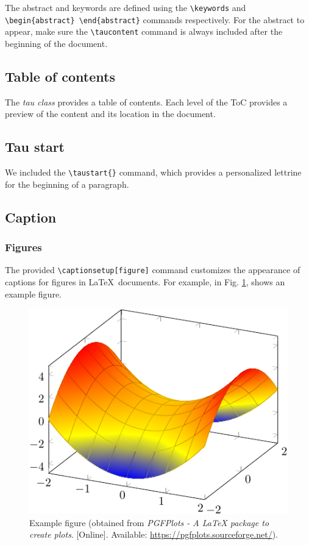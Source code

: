 \documentclass[9pt,a4paper,twoside]{tau}
\begin{document}
        The abstract and keywords are defined using the \verb*|\keywords| and \verb*|\begin{abstract} \end{abstract}| commands respectively. For the abstract to appear, make sure the \verb|\taucontent| command is always included after the beginning of the document.

    \subsection{Table of contents}

        The \textit{tau class} provides a table of contents. Each level of the ToC provides a preview of the content and its location in the document.

    \subsection{Tau start}

        We included the \verb*|\taustart{}| command, which provides a personalized lettrine for the beginning of a paragraph.
        
    \subsection{Caption}

        \subsubsection{Figures}

            The provided \verb*|\captionsetup[figure]| command customizes the appearance of captions for figures in \LaTeX\ documents. For example, in Fig. \ref{fig:figure}, shows an example figure.
			
            \begin{figure}[H]
                \centering
                \includegraphics[width=0.8\columnwidth]{Figures/Example.pdf}
                \caption{Example figure (obtained from \textit{PGFPlots - A LaTeX package to create plots}. [Online]. Available: \url{https://pgfplots.sourceforge.net/}).}
                \label{fig:figure}
            \end{figure}
\end{document}
